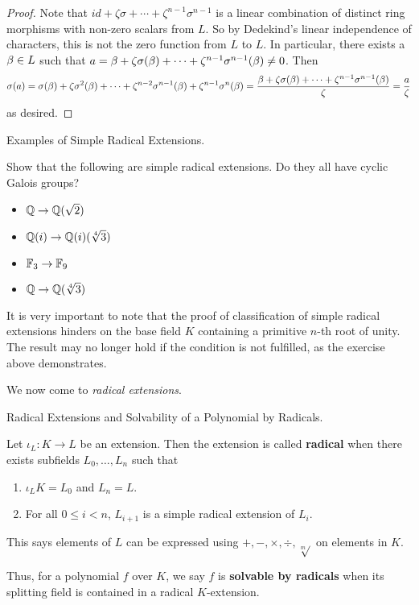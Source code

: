 \documentclass[../book.tex]{subfiles}
\begin{document}
\begin{proof}
    Note that $id + \zeta\sigma + \cdots + \zeta^{n-1}\sigma^{n-1}$
    is a linear combination of distinct ring morphisms 
    with non-zero scalars from $L$.
    So by Dedekind's linear independence of characters, 
    this is not the zero function from $L$ to $L$.
    In particular, there exists a $\beta \in L$ such that 
    $a = \beta + \zeta\sigma(\beta) + \cdots + \zeta^{n-1}\sigma^{n-1}(\beta) \neq 0$.
    Then \[
        \sigma(a) = \sigma(\beta) + \zeta\sigma^2(\beta) + \cdots 
        + \zeta^{n-2}\sigma^{n-1}(\beta) + \zeta^{n-1} \sigma^n(\beta)
        = 
        \frac{\beta + \zeta\sigma(\beta) + \cdots + \zeta^{n-1}\sigma^{n-1}(\beta)}{\zeta}
        = \frac{a}{\zeta}
    \]
    as desired.
    
\end{proof}
\begin{ex} Examples of Simple Radical Extensions.
    
    Show that the following are simple radical extensions.
    Do they all have cyclic Galois groups? 
    \begin{itemize}
        \item $\mathbb{Q} \to \mathbb{Q}(\sqrt{2})$
        \item $\mathbb{Q}(i) \to \mathbb{Q}(i)(\sqrt[4]{3})$
        \item $\mathbb{F}_3 \to \mathbb{F}_9$ 
        \item $\mathbb{Q} \to \mathbb{Q}(\sqrt[4]{3})$
    \end{itemize}
\end{ex}
\begin{rmk}
    
    It is very important to note that
    the proof of classification of simple radical extensions
    hinders on the base field $K$ containing a primitive $n$-th root of unity.
    The result may no longer hold if the condition is not fulfilled,
    as the exercise above demonstrates. 
    
\end{rmk}
We now come to \emph{radical extensions}.
\begin{dfn} Radical Extensions and Solvability of a Polynomial by Radicals.
    
    Let $\iota_L : K \to L$ be an extension.
    Then the extension is called \textbf{radical} when
    there exists subfields $L_0,\dots,L_n$ such that 
    \begin{enumerate}
        \item $\iota_L K = L_0$ and $L_n = L$.
        \item For all $0 \leq i < n$, 
        $L_{i+1}$ is a simple radical extension of $L_i$.
    \end{enumerate}
    This says elements of $L$ can be expressed 
    using $+, -, \times, \div, \sqrt[m]{}$ on elements in $K$. 

    Thus, for a polynomial $f$ over $K$,
    we say $f$ is \textbf{solvable by radicals} when
    its splitting field is contained in a radical $K$-extension.
    
\end{dfn}
\end{document}
